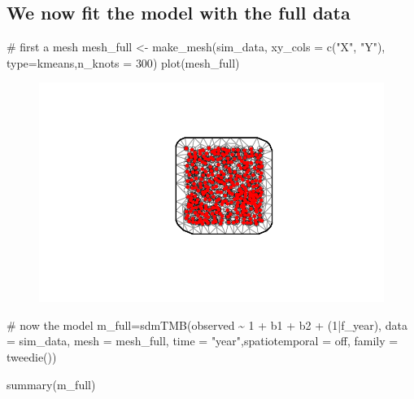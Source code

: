 \documentclass[
  letterpaper,
  DIV=11,
  numbers=noendperiod]{scrartcl}
\newenvironment{Shaded}{\begin{snugshade}}{\end{snugshade}}
\newcommand{\AttributeTok}[1]{\textcolor[rgb]{0.40,0.45,0.13}{#1}}
\newcommand{\CommentTok}[1]{\textcolor[rgb]{0.37,0.37,0.37}{#1}}
\newcommand{\DecValTok}[1]{\textcolor[rgb]{0.68,0.00,0.00}{#1}}
\newcommand{\FunctionTok}[1]{\textcolor[rgb]{0.28,0.35,0.67}{#1}}
\newcommand{\NormalTok}[1]{\textcolor[rgb]{0.00,0.23,0.31}{#1}}
\newcommand{\OtherTok}[1]{\textcolor[rgb]{0.00,0.23,0.31}{#1}}
\newcommand{\SpecialCharTok}[1]{\textcolor[rgb]{0.37,0.37,0.37}{#1}}
\newcommand{\StringTok}[1]{\textcolor[rgb]{0.13,0.47,0.30}{#1}}
\begin{document}
\hypertarget{we-now-fit-the-model-with-the-full-data}{%
\subsection{We now fit the model with the full
data}\label{we-now-fit-the-model-with-the-full-data}}

\begin{Shaded}
\begin{Highlighting}[]
\CommentTok{\# first a mesh}
\NormalTok{mesh\_full }\OtherTok{\textless{}{-}} \FunctionTok{make\_mesh}\NormalTok{(sim\_data, }\AttributeTok{xy\_cols =} \FunctionTok{c}\NormalTok{(}\StringTok{"X"}\NormalTok{, }\StringTok{"Y"}\NormalTok{), }\AttributeTok{type=}\StringTok{\textquotesingle{}kmeans\textquotesingle{}}\NormalTok{,}\AttributeTok{n\_knots =} \DecValTok{300}\NormalTok{)}
\FunctionTok{plot}\NormalTok{(mesh\_full)}
\end{Highlighting}
\end{Shaded}

\begin{figure}[H]

{\centering \includegraphics{simulation_sdmTMB_files/figure-pdf/unnamed-chunk-3-1.pdf}

}

\end{figure}

\begin{Shaded}
\begin{Highlighting}[]
\CommentTok{\# now the model}
\NormalTok{m\_full}\OtherTok{=}\FunctionTok{sdmTMB}\NormalTok{(observed }\SpecialCharTok{\textasciitilde{}} \DecValTok{1} \SpecialCharTok{+}\NormalTok{ b1 }\SpecialCharTok{+}\NormalTok{ b2 }\SpecialCharTok{+}\NormalTok{ (}\DecValTok{1}\SpecialCharTok{|}\NormalTok{f\_year),}
              \AttributeTok{data =}\NormalTok{ sim\_data, }\AttributeTok{mesh =}\NormalTok{ mesh\_full, }\AttributeTok{time =} \StringTok{"year"}\NormalTok{,}\AttributeTok{spatiotemporal =} \StringTok{\textquotesingle{}off\textquotesingle{}}\NormalTok{,}
              \AttributeTok{family =} \FunctionTok{tweedie}\NormalTok{())}

\FunctionTok{summary}\NormalTok{(m\_full)}
\end{Highlighting}
\end{Shaded}
\end{document}
